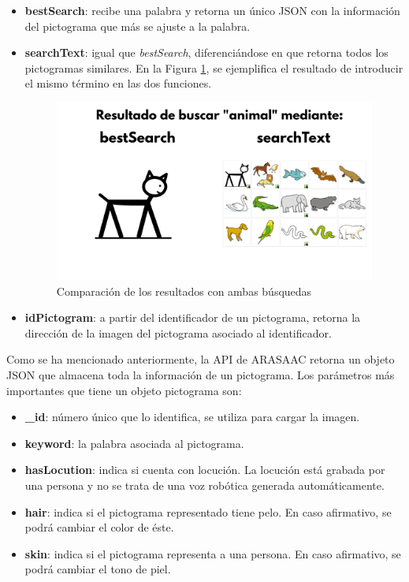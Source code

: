 \begin{itemize}
	\item \textbf{bestSearch}: recibe una palabra y retorna un único JSON con la información del pictograma que más se ajuste a la palabra.
	
	\item \textbf{searchText}: igual que \textit{bestSearch}, diferenciándose en que retorna todos los pictogramas similares. En la Figura \ref{fig:compBusq}, se ejemplifica el resultado de introducir el mismo término en las dos funciones.
	
	 \begin{figure}[h!]
	 	\centering
	 	\includegraphics[width=0.8\linewidth]{Imagenes/Bitmap/techComparacionBusquedas}
	 	\caption{Comparación de los resultados con ambas búsquedas}
	 	\label{fig:compBusq}
	 \end{figure}
	
	\item \textbf{idPictogram}: a partir del identificador de un pictograma, retorna la dirección de la imagen del pictograma asociado al identificador. 
\end{itemize}


Como se ha mencionado anteriormente, la API de ARASAAC retorna un objeto JSON que almacena toda la información de un pictograma. Los parámetros más importantes que tiene un objeto pictograma son: 



\begin{itemize}
	\item \textbf{\_id}: número único que lo identifica, se utiliza para cargar la imagen.
	
	\item \textbf{keyword}: la palabra asociada al pictograma.
	
	\item \textbf{hasLocution}: indica si cuenta con locución. La locución está grabada por una persona y no se trata de una voz robótica generada automáticamente.
	
	\item \textbf{hair}: indica si el pictograma representado tiene pelo. En caso afirmativo, se podrá cambiar el color de éste.
	
	\item \textbf{skin}: indica si el pictograma representa a una persona. En caso afirmativo, se podrá cambiar el tono de piel. 
	
\end{itemize}

